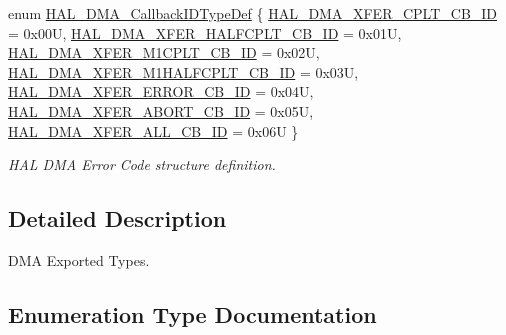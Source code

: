 \begin{DoxyCompactItemize}
\item 
enum \hyperlink{group___d_m_a___exported___types_gafbe8b2bd9ce2128de6cdc08ccde7e8ad}{H\+A\+L\+\_\+\+D\+M\+A\+\_\+\+Callback\+I\+D\+Type\+Def} \{ \newline
\hyperlink{group___d_m_a___exported___types_ggafbe8b2bd9ce2128de6cdc08ccde7e8ada7d4463d9db2e6d15282128b44ae08e12}{H\+A\+L\+\_\+\+D\+M\+A\+\_\+\+X\+F\+E\+R\+\_\+\+C\+P\+L\+T\+\_\+\+C\+B\+\_\+\+ID} = 0x00U, 
\hyperlink{group___d_m_a___exported___types_ggafbe8b2bd9ce2128de6cdc08ccde7e8ada4b1606f39a4eec41d958bc878719f046}{H\+A\+L\+\_\+\+D\+M\+A\+\_\+\+X\+F\+E\+R\+\_\+\+H\+A\+L\+F\+C\+P\+L\+T\+\_\+\+C\+B\+\_\+\+ID} = 0x01U, 
\hyperlink{group___d_m_a___exported___types_ggafbe8b2bd9ce2128de6cdc08ccde7e8ada09feb1bab1c32b35afd27b9316958051}{H\+A\+L\+\_\+\+D\+M\+A\+\_\+\+X\+F\+E\+R\+\_\+\+M1\+C\+P\+L\+T\+\_\+\+C\+B\+\_\+\+ID} = 0x02U, 
\hyperlink{group___d_m_a___exported___types_ggafbe8b2bd9ce2128de6cdc08ccde7e8adac2e68a660d9830fa1e965482b9befbb9}{H\+A\+L\+\_\+\+D\+M\+A\+\_\+\+X\+F\+E\+R\+\_\+\+M1\+H\+A\+L\+F\+C\+P\+L\+T\+\_\+\+C\+B\+\_\+\+ID} = 0x03U, 
\newline
\hyperlink{group___d_m_a___exported___types_ggafbe8b2bd9ce2128de6cdc08ccde7e8ada3e76bc89154e0b50333cc551bf0337a6}{H\+A\+L\+\_\+\+D\+M\+A\+\_\+\+X\+F\+E\+R\+\_\+\+E\+R\+R\+O\+R\+\_\+\+C\+B\+\_\+\+ID} = 0x04U, 
\hyperlink{group___d_m_a___exported___types_ggafbe8b2bd9ce2128de6cdc08ccde7e8ada3059a9412e0624699e9123ba2bccdf3e}{H\+A\+L\+\_\+\+D\+M\+A\+\_\+\+X\+F\+E\+R\+\_\+\+A\+B\+O\+R\+T\+\_\+\+C\+B\+\_\+\+ID} = 0x05U, 
\hyperlink{group___d_m_a___exported___types_ggafbe8b2bd9ce2128de6cdc08ccde7e8adac9935fd906719942d6b09cfd55e837f0}{H\+A\+L\+\_\+\+D\+M\+A\+\_\+\+X\+F\+E\+R\+\_\+\+A\+L\+L\+\_\+\+C\+B\+\_\+\+ID} = 0x06U
 \}\begin{DoxyCompactList}\small\item\em H\+AL D\+MA Error Code structure definition. \end{DoxyCompactList}
\end{DoxyCompactItemize}


\subsection{Detailed Description}
D\+MA Exported Types. 



\subsection{Enumeration Type Documentation}
\mbox{\label{group___d_m_a___exported___types_gafbe8b2bd9ce2128de6cdc08ccde7e8ad}} 
